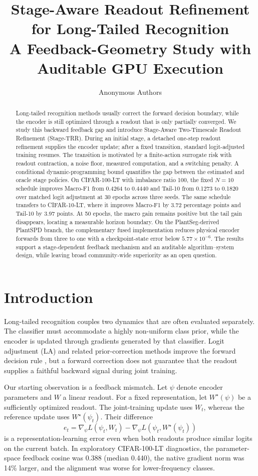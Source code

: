 \documentclass[10pt,letterpaper]{article}
\title{Stage-Aware Readout Refinement for Long-Tailed Recognition\\
\large A Feedback-Geometry Study with Auditable GPU Execution}
\author{Anonymous Authors}
\date{}
\newcommand{\method}{Stage-TRR}
\newcommand{\macroF}{Macro-F1}
\newcommand{\tailF}{Tail-10}
\begin{document}
\maketitle

\begin{abstract}
Long-tailed recognition methods usually correct the forward decision boundary, while the encoder is still optimized through a readout that is only partially converged. We study this backward feedback gap and introduce Stage-Aware Two-Timescale Readout Refinement (\method). During an initial stage, a detached one-step readout refinement supplies the encoder update; after a fixed transition, standard logit-adjusted training resumes. The transition is motivated by a finite-action surrogate risk with readout contraction, a noise floor, measured computation, and a switching penalty. A conditional dynamic-programming bound quantifies the gap between the estimated and oracle stage policies. On CIFAR-100-LT with imbalance ratio 100, the fixed $N=10$ schedule improves \macroF{} from 0.4264 to 0.4440 and \tailF{} from 0.1273 to 0.1820 over matched logit adjustment at 30 epochs across three seeds. The same schedule transfers to CIFAR-10-LT, where it improves \macroF{} by 3.72 percentage points and \tailF{} by 3.97 points. At 50 epochs, the macro gain remains positive but the tail gain disappears, locating a measurable horizon boundary. On the PlantSeg-derived PlantSPD branch, the complementary fused implementation reduces physical encoder forwards from three to one with a checkpoint-state error below $5.77\times10^{-6}$. The results support a stage-dependent feedback mechanism and an auditable algorithm--system design, while leaving broad community-wide superiority as an open question.
\end{abstract}

\section{Introduction}
Long-tailed recognition couples two dynamics that are often evaluated separately. The classifier must accommodate a highly non-uniform class prior, while the encoder is updated through gradients generated by that classifier. Logit adjustment (LA) and related prior-correction methods improve the forward decision rule \citep{menon2021longtail,cao2019ldam,ren2020balanced}, but a forward correction does not guarantee that the readout supplies a faithful backward signal during joint training.

Our starting observation is a feedback mismatch. Let $\psi$ denote encoder parameters and $W$ a linear readout. For a fixed representation, let $W^\star(\psi)$ be a sufficiently optimized readout. The joint-training update uses $W_t$, whereas the reference update uses $W^\star(\psi_t)$. Their difference
\[
e_t = \nabla_\psi L(\psi_t,W_t)-
      \nabla_\psi L(\psi_t,W^\star(\psi_t))
\]
is a representation-learning error even when both readouts produce similar logits on the current batch. In exploratory CIFAR-100-LT diagnostics, the parameter-space feedback cosine was 0.388 (median 0.440), the native gradient norm was 14\% larger, and the alignment was worse for lower-frequency classes.
\end{document}
